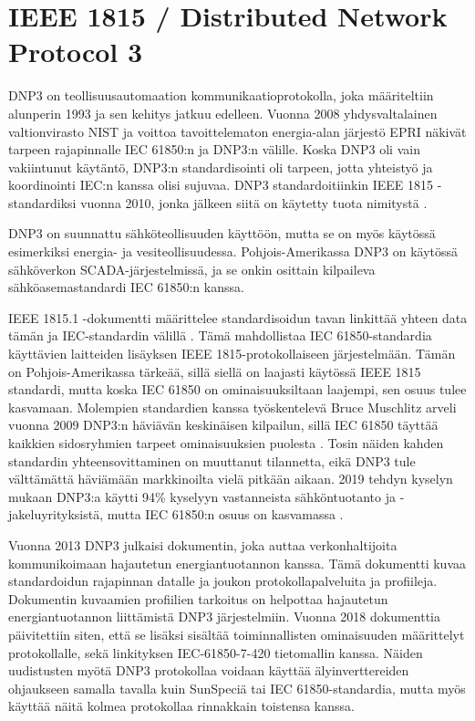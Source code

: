 \section{IEEE 1815 / Distributed Network Protocol 3}
  DNP3 on teollisuusautomaation kommunikaatioprotokolla, joka määriteltiin alunperin 1993 ja sen kehitys jatkuu edelleen. Vuonna 2008 yhdysvaltalainen valtionvirasto NIST ja voittoa tavoittelematon energia-alan järjestö \gls{EPRI} näkivät tarpeen rajapinnalle \gls{IEC} 61850:n ja DNP3:n välille. Koska DNP3 oli vain vakiintunut käytäntö, DNP3:n standardisointi oli tarpeen, jotta yhteistyö ja koordinointi \gls{IEC}:n kanssa olisi sujuvaa. DNP3 standardoitiinkin \gls{IEEE} 1815 -standardiksi vuonna 2010, jonka jälkeen siitä on käytetty tuota nimitystä \parencite{DNP3&61850}.

  DNP3 on suunnattu sähköteollisuuden käyttöön, mutta se on myös käytössä esimerkiksi energia- ja vesiteollisuudessa. Pohjois-Amerikassa DNP3 on käytössä sähköverkon \gls{SCADA}-järjestelmissä, ja se onkin osittain kilpaileva sähköasemastandardi IEC 61850:n kanssa.

  IEEE 1815.1 -dokumentti määrittelee standardisoidun tavan linkittää yhteen data tämän ja IEC-standardin välillä \parencite{IEEE1815.1}. Tämä mahdollistaa IEC 61850-standardia käyttävien laitteiden lisäyksen IEEE 1815-protokollaiseen järjestelmään. Tämän on Pohjois-Amerikassa tärkeää, sillä siellä on laajasti käytössä IEEE 1815 standardi, mutta koska IEC 61850 on ominaisuuksiltaan laajempi, sen osuus tulee kasvamaan. Molempien standardien kanssa työskentelevä Bruce Muschlitz arveli vuonna 2009 DNP3:n häviävän keskinäisen kilpailun, sillä IEC 61850 täyttää kaikkien sidosryhmien tarpeet ominaisuuksien puolesta \parencite{DNPvsIEC}. Tosin näiden kahden standardin yhteensovittaminen on muuttanut tilannetta, eikä DNP3 tule välttämättä häviämään markkinoilta vielä pitkään aikaan. 2019 tehdyn kyselyn mukaan DNP3:a käytti 94\% kyselyyn vastanneista sähköntuotanto ja -jakeluyrityksistä, mutta IEC 61850:n osuus on kasvamassa \parencite{DNP3Study}.

  Vuonna 2013 DNP3 julkaisi dokumentin, joka auttaa verkonhaltijoita kommunikoimaan hajautetun energiantuotannon kanssa. Tämä dokumentti kuvaa standardoidun rajapinnan datalle ja joukon protokollapalveluita ja profiileja. Dokumentin kuvaamien profiilien tarkoitus on helpottaa hajautetun energiantuotannon liittämistä DNP3 järjestelmiin. Vuonna 2018 dokumenttia päivitettiin siten, että se lisäksi sisältää toiminnallisten ominaisuuden määrittelyt protokollalle, sekä linkityksen IEC-61850-7-420 tietomallin kanssa. Näiden uudistusten myötä DNP3 protokollaa voidaan käyttää älyinverttereiden ohjaukseen samalla tavalla kuin SunSpeciä tai IEC 61850-standardia, mutta myös käyttää näitä kolmea protokollaa rinnakkain toistensa kanssa. \parencite{DNP3Inv, DNP3AppNote}


